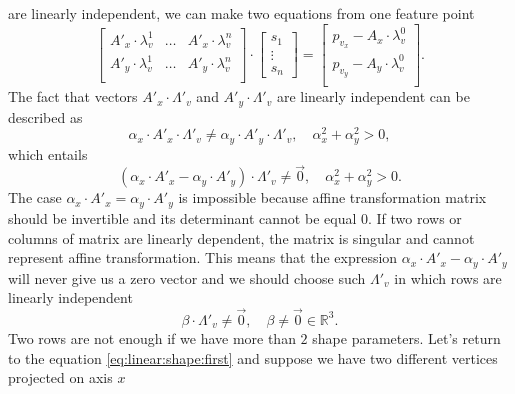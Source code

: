 are linearly independent,
we can make two equations from one feature point
\begin{equation*}
  \begin{bmatrix}
    A'_x \cdot \lambda^1_v & \dots & A'_x \cdot \lambda^n_v \\
    A'_y \cdot \lambda^1_v & \dots & A'_y \cdot \lambda^n_v \\
  \end{bmatrix}
  \cdot \begin{bmatrix}
    s_1 \\
    \vdots \\
    s_n
  \end{bmatrix}
  = \begin{bmatrix}
    p_{v_x} - A_x \cdot \lambda^0_v \\
    p_{v_y} - A_y \cdot \lambda^0_v \\
  \end{bmatrix}.
\end{equation*}
The fact that vectors $A'_x \cdot \Lambda'_v$ and $A'_y \cdot \Lambda'_v$
are linearly independent can be described as
\begin{equation*}
  \alpha_x \cdot A'_x \cdot \Lambda'_v
    \neq \alpha_y \cdot A'_y \cdot \Lambda'_v,
  \quad \alpha_x^2 + \alpha_y^2 > 0,
\end{equation*}
which entails
\begin{equation*}
  \left( \alpha_x \cdot A'_x - \alpha_y \cdot A'_y \right) \cdot \Lambda'_v
    \neq \vec{0},
  \quad \alpha_x^2 + \alpha_y^2 > 0.
\end{equation*}
The case $\alpha_x \cdot A'_x = \alpha_y \cdot A'_y$ is impossible
because affine transformation matrix should be invertible
and its determinant cannot be equal $0$.
If two rows or columns of matrix are linearly dependent,
the matrix is singular and cannot represent affine transformation.
This means that the expression $\alpha_x \cdot A'_x - \alpha_y \cdot A'_y$
will never give us a zero vector and we should choose such $\Lambda'_v$
in which rows are linearly independent
\begin{equation}\label{eq:vertex-components:independent}
  \beta \cdot \Lambda'_v \neq \vec{0},
  \quad \beta \neq \vec{0} \in \mathbb{R}^3.
\end{equation}
Two rows are not enough if we have more than $2$ shape parameters.
Let's return to the equation \eqref{eq:linear:shape:first}
and suppose we have two different vertices projected on axis $x$
